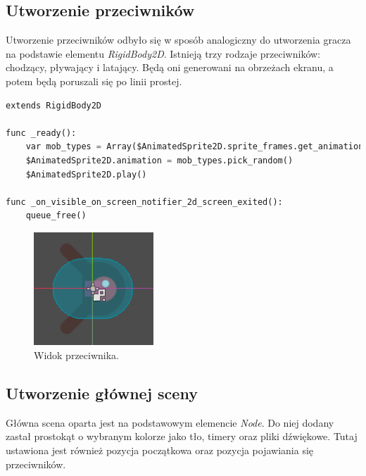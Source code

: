 \documentclass[a4paper,12pt]{article}
\begin{document}
\newpage
\subsection{Utworzenie przeciwników}

Utworzenie przeciwników odbyło się w sposób analogiczny do utworzenia gracza na podstawie elementu \textit{RigidBody2D}. Istnieją trzy rodzaje przeciwników: chodzący, pływający i latający. Będą oni generowani na obrzeżach ekranu, a potem będą poruszali się po linii prostej.

\begin{lstlisting}[language=Python]
extends RigidBody2D

func _ready():
	var mob_types = Array($AnimatedSprite2D.sprite_frames.get_animation_names())
	$AnimatedSprite2D.animation = mob_types.pick_random()
	$AnimatedSprite2D.play()

func _on_visible_on_screen_notifier_2d_screen_exited():
	queue_free()
\end{lstlisting}

\begin{figure}[h]
    \centering
    \includegraphics[width=0.4\textwidth]{mob_swim.png}
    \caption{Widok przeciwnika.}
    \label{fig:mob1}
\end{figure}

\newpage
\subsection{Utworzenie głównej sceny}

Główna scena oparta jest na podstawowym elemencie \textit{Node}. Do niej dodany zastał prostokąt o wybranym kolorze jako tło, timery oraz pliki dźwiękowe. Tutaj ustawiona jest również pozycja początkowa oraz pozycja pojawiania się przeciwników.
\end{document}
